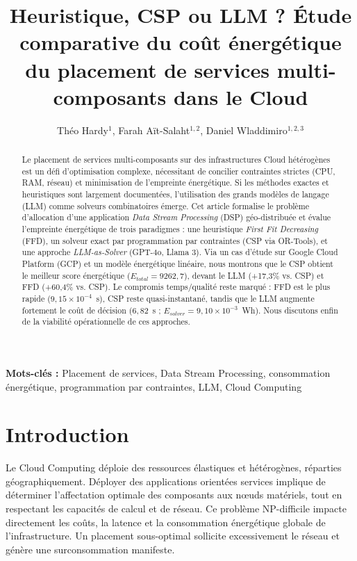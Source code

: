 ﻿\documentclass[systeme]{compas2026}
\title{Heuristique, CSP ou LLM ?
Étude comparative du coût énergétique du placement de services multi-composants dans le Cloud}
\author{Théo Hardy$^{1}$, Farah Aït-Salaht$^{1,2}$, Daniel Wladdimiro$^{1,2,3}$}
\date{}
\begin{document}
\maketitle

\begin{abstract}
Le placement de services multi-composants sur des infrastructures Cloud hétérogènes est un défi d'optimisation complexe, nécessitant de concilier contraintes strictes (CPU, RAM, réseau) et minimisation de l'empreinte énergétique. Si les méthodes exactes et heuristiques sont largement documentées, l'utilisation des grands modèles de langage (LLM) comme solveurs combinatoires émerge. Cet article formalise le problème d'allocation d'une application \emph{Data Stream Processing} (DSP) géo-distribuée et évalue l'empreinte énergétique de trois paradigmes : une heuristique \emph{First Fit Decreasing} (FFD), un solveur exact par programmation par contraintes (CSP via OR-Tools), et une approche \emph{LLM-as-Solver} (GPT-4o, Llama 3). Via un cas d'étude sur Google Cloud Platform (GCP) et un modèle énergétique linéaire, nous montrons que le CSP obtient le meilleur score énergétique ($E_{total}=9262{,}7$), devant le LLM (+17,3\% vs. CSP) et FFD (+60,4\% vs. CSP). Le compromis temps/qualité reste marqué : FFD est le plus rapide ($9{,}15\times10^{-4}$~s), CSP reste quasi-instantané, tandis que le LLM augmente fortement le coût de décision ($6{,}82$~s ; $E_{solver}=9{,}10\times10^{-3}$~Wh). Nous discutons enfin de la viabilité opérationnelle de ces approches.
\end{abstract}

\smallskip
\noindent\textbf{Mots-clés :} Placement de services, Data Stream Processing, consommation énergétique, programmation par contraintes, LLM, Cloud Computing

\section{Introduction}
\label{sec:intro}

Le Cloud Computing déploie des ressources élastiques et hétérogènes, réparties géographiquement. Déployer des applications orientées services implique de déterminer l'affectation optimale des composants aux nœuds matériels, tout en respectant les capacités de calcul et de réseau. Ce problème NP-difficile \cite{wang2020service} impacte directement les coûts, la latence et la consommation énergétique globale de l'infrastructure. Un placement sous-optimal sollicite excessivement le réseau et génère une surconsommation manifeste. 
\end{document}
